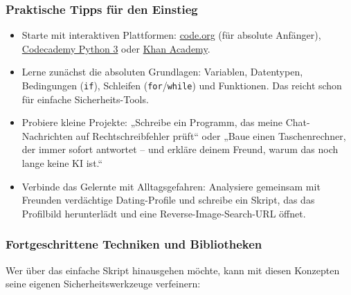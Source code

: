 \documentclass[12pt,a4paper,oneside]{scrartcl}
\begin{document}
	\subsubsection{Praktische Tipps für den Einstieg}
	
	\begin{itemize}
		\item Starte mit interaktiven Plattformen: \href{https://code.org}{code.org} (für absolute Anfänger), \href{https://www.codecademy.com/learn/learn-python-3}{Codecademy Python 3} oder \href{https://www.khanacademy.org/computing/computer-programming}{Khan Academy}.
		\item Lerne zunächst die absoluten Grundlagen: Variablen, Datentypen, Bedingungen (\texttt{if}), Schleifen (\texttt{for}/\texttt{while}) und Funktionen. Das reicht schon für einfache Sicherheits-Tools.
		\item Probiere kleine Projekte: „Schreibe ein Programm, das meine Chat-Nachrichten auf Rechtschreibfehler prüft“ oder „Baue einen Taschenrechner, der immer sofort antwortet – und erkläre deinem Freund, warum das noch lange keine KI ist.“
		\item Verbinde das Gelernte mit Alltagsgefahren: Analysiere gemeinsam mit Freunden verdächtige Dating-Profile und schreibe ein Skript, das das Profilbild herunterlädt und eine Reverse-Image-Search-URL öffnet.
	\end{itemize}
	
	\subsubsection{Fortgeschrittene Techniken und Bibliotheken}
	
	Wer über das einfache Skript hinausgehen möchte, kann mit diesen Konzepten seine eigenen Sicherheitswerkzeuge verfeinern:
	
\end{document}
